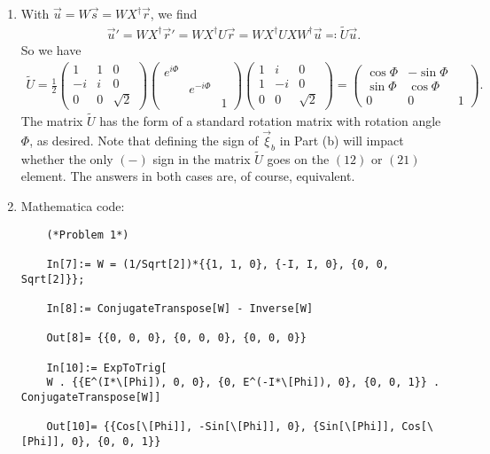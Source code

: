 \documentclass{article}
\theoremstyle{definition}
\newcommand{\f}[2]{\frac{#1}{#2}}
\begin{document}
\begin{enumerate}[label=(\alph*)]
	
	
	\item With $\vec{u} = W \vec{s} = W X^\dagger \vec{r}$, we find
	\begin{align*}
	\vec{u}' = WX^\dagger \vec{r}' = W X^\dagger U \vec{r} = WX^\dagger U X W^\dagger \vec{u} \eqcolon \widetilde{U}\vec{u}.
	\end{align*}
	So we have
	\begin{align*}
	\widetilde{U} = \f{1}{2} \begin{pmatrix}
	1 & 1 & 0 \\ -i & i & 0 \\ 0 & 0 & \sqrt{2}
	\end{pmatrix}    
	\begin{pmatrix}
	e^{i\Phi} && \\ &e^{-i\Phi}& \\ && 1
	\end{pmatrix}
	\begin{pmatrix}
	1 & i & 0\\
	1 & -i & 0 \\
	0 & 0 & \sqrt{2}
	\end{pmatrix}
	= \begin{pmatrix*}
	\cos\Phi & -\sin\Phi & \\ \sin\Phi & \cos\Phi & \\ 0 & 0& 1
	\end{pmatrix*}.
	\end{align*}
	The matrix $\widetilde{U}$ has the form of a standard rotation matrix with rotation angle $\Phi$, as desired. Note that defining the sign of $\vec{\xi}_b$ in Part (b) will impact whether the only $(-)$ sign in the matrix $\widetilde{U}$ goes on the $(12)$ or $(21)$ element. The answers in both cases are, of course, equivalent. 
	
	
	
	\item Mathematica code:
	\begin{lstlisting}
	(*Problem 1*)
	
	In[7]:= W = (1/Sqrt[2])*{{1, 1, 0}, {-I, I, 0}, {0, 0, Sqrt[2]}};
	
	In[8]:= ConjugateTranspose[W] - Inverse[W]
	
	Out[8]= {{0, 0, 0}, {0, 0, 0}, {0, 0, 0}}
	
	In[10]:= ExpToTrig[
	W . {{E^(I*\[Phi]), 0, 0}, {0, E^(-I*\[Phi]), 0}, {0, 0, 1}} . ConjugateTranspose[W]]
	
	Out[10]= {{Cos[\[Phi]], -Sin[\[Phi]], 0}, {Sin[\[Phi]], Cos[\[Phi]], 0}, {0, 0, 1}}
	\end{lstlisting}
\end{enumerate} 
\end{document}
